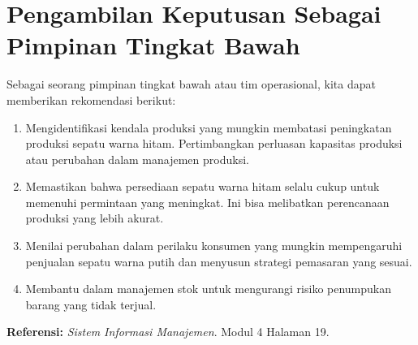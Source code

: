 \documentclass[letterpaper,11pt]{article}
\begin{document}
\section{Pengambilan Keputusan Sebagai Pimpinan Tingkat Bawah}
Sebagai seorang pimpinan tingkat bawah atau tim operasional, kita dapat memberikan rekomendasi berikut:
  \begin{enumerate}
    \item Mengidentifikasi kendala produksi yang mungkin membatasi peningkatan produksi sepatu warna hitam. Pertimbangkan perluasan kapasitas produksi atau perubahan dalam manajemen produksi.
    \item Memastikan bahwa persediaan sepatu warna hitam selalu cukup untuk memenuhi permintaan yang meningkat. Ini bisa melibatkan perencanaan produksi yang lebih akurat.
    \item Menilai perubahan dalam perilaku konsumen yang mungkin mempengaruhi penjualan sepatu warna putih dan menyusun strategi pemasaran yang sesuai.
    \item Membantu dalam manajemen stok untuk mengurangi risiko penumpukan barang yang tidak terjual.
  \end{enumerate}
  \textbf{Referensi:}
  \textit{Sistem Informasi Manajemen}. Modul 4 Halaman 19.
  
\end{document}
